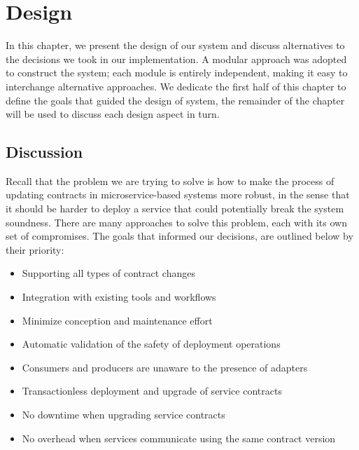 
%

\chapter{Design}
\label{cha:test}

In this chapter, we present the design of our system and discuss alternatives to the decisions we took in our implementation.
A modular approach was adopted to construct the system;
each module is entirely independent, making it easy to interchange alternative approaches.
We dedicate the first half of this chapter to define the goals that guided the design of system,
the remainder of the chapter will be used to discuss each design aspect in turn.

\section{Discussion} %
\label{sec:discussion}

Recall that the problem we are trying to solve is how to make the process of updating contracts in
microservice-based systems more robust, in the sense that it should be harder to deploy a service that could
potentially break the system soundness.
There are many approaches to solve this problem, each with its own set of compromises.
The goals that informed our decisions, are outlined below by their priority:

\begin{itemize}
    \item Supporting all types of contract changes
    \item Integration with existing tools and workflows
    \item Minimize conception and maintenance effort
    \item Automatic validation of the safety of deployment operations
    \item Consumers and producers are unaware to the presence of adapters
    \item Transactionless deployment and upgrade of service contracts
    \item No downtime when upgrading service contracts
    \item No overhead when services communicate using the same contract version
\end{itemize}

